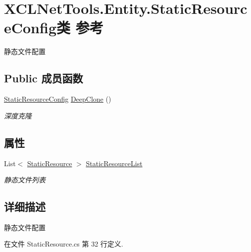 \hypertarget{class_x_c_l_net_tools_1_1_entity_1_1_static_resource_config}{\section{X\-C\-L\-Net\-Tools.\-Entity.\-Static\-Resource\-Config类 参考}
\label{class_x_c_l_net_tools_1_1_entity_1_1_static_resource_config}
}


静态文件配置  


\subsection*{Public 成员函数}
\begin{DoxyCompactItemize}
\item 
\hyperlink{class_x_c_l_net_tools_1_1_entity_1_1_static_resource_config}{Static\-Resource\-Config} \hyperlink{class_x_c_l_net_tools_1_1_entity_1_1_static_resource_config_a488ef1a24b5a4be8cdfc93610cc8bb31}{Deep\-Clone} ()
\begin{DoxyCompactList}\small\item\em 深度克隆 \end{DoxyCompactList}\end{DoxyCompactItemize}
\subsection*{属性}
\begin{DoxyCompactItemize}
\item 
List$<$ \hyperlink{class_x_c_l_net_tools_1_1_entity_1_1_static_resource}{Static\-Resource} $>$ \hyperlink{class_x_c_l_net_tools_1_1_entity_1_1_static_resource_config_a4525e28db253a1da329b5ebd1982f04d}{Static\-Resource\-List}
\begin{DoxyCompactList}\small\item\em 静态文件列表 \end{DoxyCompactList}\end{DoxyCompactItemize}


\subsection{详细描述}
静态文件配置 



在文件 Static\-Resource.\-cs 第 32 行定义.



